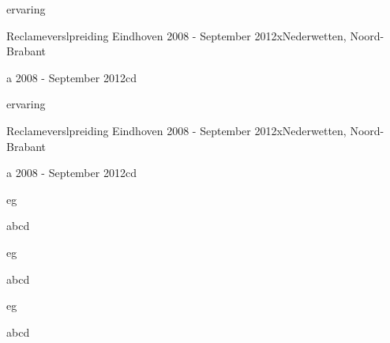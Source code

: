 \begin{cSection}{\textwidth}{0.6\textwidth}{0.3\textwidth}
{

\begin{cSubsection}{ervaring}
    \begin{experienceItem}{Reclameverslpreiding Eindhoven}{ 2008 - September 2012}{x}{Nederwetten, Noord-Brabant}
    \end{experienceItem}
    
    \begin{experienceItem}{a}{ 2008 - September 2012}{c}{d}
    \end{experienceItem}
\end{cSubsection}

\begin{cSubsection}{ervaring}
    \begin{experienceItem}{Reclameverslpreiding Eindhoven}{ 2008 - September 2012}{x}{Nederwetten, Noord-Brabant}
    \end{experienceItem}
    
    \begin{experienceItem}{a}{ 2008 - September 2012}{c}{d}
    \end{experienceItem}
\end{cSubsection}
}
{

\begin{cSubsection}{eg}
\begin{experienceItem}{a}{b}{c}{d}
\end{experienceItem}
\end{cSubsection}

\begin{cSubsection}{eg}
\begin{experienceItem}{a}{b}{c}{d}
\end{experienceItem}
\end{cSubsection}

\begin{cSubsection}{eg}
\begin{experienceItem}{a}{b}{c}{d}
\end{experienceItem}
\end{cSubsection}
}
\end{cSection}
